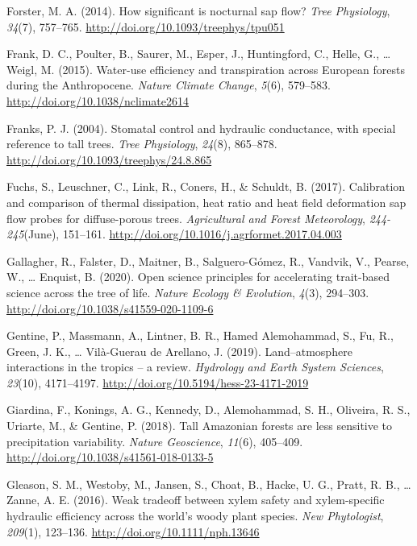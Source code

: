 \documentclass[11pt,twoside]{reedthesis}
\begin{document}
\hypertarget{ref-Forster2014}{}
Forster, M. A. (2014). How significant is nocturnal sap flow? \emph{Tree
Physiology}, \emph{34}(7), 757--765.
\url{http://doi.org/10.1093/treephys/tpu051}

\hypertarget{ref-Frank2015}{}
Frank, D. C., Poulter, B., Saurer, M., Esper, J., Huntingford, C.,
Helle, G., \ldots{} Weigl, M. (2015). Water-use efficiency and
transpiration across European forests during the Anthropocene.
\emph{Nature Climate Change}, \emph{5}(6), 579--583.
\url{http://doi.org/10.1038/nclimate2614}

\hypertarget{ref-Franks2004}{}
Franks, P. J. (2004). Stomatal control and hydraulic conductance, with
special reference to tall trees. \emph{Tree Physiology}, \emph{24}(8),
865--878. \url{http://doi.org/10.1093/treephys/24.8.865}

\hypertarget{ref-Fuchs2017}{}
Fuchs, S., Leuschner, C., Link, R., Coners, H., \& Schuldt, B. (2017).
Calibration and comparison of thermal dissipation, heat ratio and heat
field deformation sap flow probes for diffuse-porous trees.
\emph{Agricultural and Forest Meteorology}, \emph{244-245}(June),
151--161. \url{http://doi.org/10.1016/j.agrformet.2017.04.003}

\hypertarget{ref-Gallagher2020}{}
Gallagher, R., Falster, D., Maitner, B., Salguero-Gómez, R., Vandvik,
V., Pearse, W., \ldots{} Enquist, B. (2020). Open science principles for
accelerating trait-based science across the tree of life. \emph{Nature
Ecology \& Evolution}, \emph{4}(3), 294--303.
\url{http://doi.org/10.1038/s41559-020-1109-6}

\hypertarget{ref-gentine_landatmosphere_2019}{}
Gentine, P., Massmann, A., Lintner, B. R., Hamed Alemohammad, S., Fu,
R., Green, J. K., \ldots{} Vilà-Guerau de Arellano, J. (2019).
Land--atmosphere interactions in the tropics -- a review.
\emph{Hydrology and Earth System Sciences}, \emph{23}(10), 4171--4197.
\url{http://doi.org/10.5194/hess-23-4171-2019}

\hypertarget{ref-giardina_tall_2018}{}
Giardina, F., Konings, A. G., Kennedy, D., Alemohammad, S. H., Oliveira,
R. S., Uriarte, M., \& Gentine, P. (2018). Tall Amazonian forests are
less sensitive to precipitation variability. \emph{Nature Geoscience},
\emph{11}(6), 405--409. \url{http://doi.org/10.1038/s41561-018-0133-5}

\hypertarget{ref-gleason_weak_2016}{}
Gleason, S. M., Westoby, M., Jansen, S., Choat, B., Hacke, U. G., Pratt,
R. B., \ldots{} Zanne, A. E. (2016). Weak tradeoff between xylem safety
and xylem-specific hydraulic efficiency across the world's woody plant
species. \emph{New Phytologist}, \emph{209}(1), 123--136.
\url{http://doi.org/10.1111/nph.13646}
\end{document}
